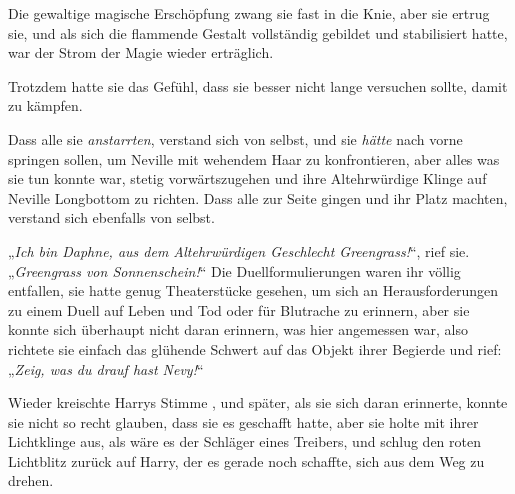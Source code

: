 Die gewaltige magische Erschöpfung zwang sie fast in die Knie, aber sie ertrug sie, und als sich die flammende Gestalt vollständig gebildet und stabilisiert hatte, war der Strom der Magie wieder erträglich.

Trotzdem hatte sie das Gefühl, dass sie besser nicht lange versuchen sollte, damit zu kämpfen.

Dass alle sie \emph{anstarrten}, verstand sich von selbst, und sie \emph{hätte} nach vorne springen sollen, um Neville mit wehendem Haar zu konfrontieren, aber alles was sie tun konnte war, stetig vorwärtszugehen und ihre Altehrwürdige Klinge auf Neville Longbottom zu richten. Dass alle zur Seite gingen und ihr Platz machten, verstand sich ebenfalls von selbst.

„\emph{Ich bin Daphne, aus dem Altehrwürdigen Geschlecht Greengrass!}“, rief sie. „\emph{Greengrass von Sonnenschein!}“ Die Duellformulierungen waren ihr völlig entfallen, sie hatte genug Theaterstücke gesehen, um sich an Herausforderungen zu einem Duell auf Leben und Tod oder für Blutrache zu erinnern, aber sie konnte sich überhaupt nicht daran erinnern, was hier angemessen war, also richtete sie einfach das glühende Schwert auf das Objekt ihrer Begierde und rief: „\emph{Zeig, was du drauf hast Nevy!}“

Wieder kreischte Harrys Stimme , und später, als sie sich daran erinnerte, konnte sie nicht so recht glauben, dass sie es geschafft hatte, aber sie holte mit ihrer Lichtklinge aus, als wäre es der Schläger eines Treibers, und schlug den roten Lichtblitz zurück auf Harry, der es gerade noch schaffte, sich aus dem Weg zu drehen.

